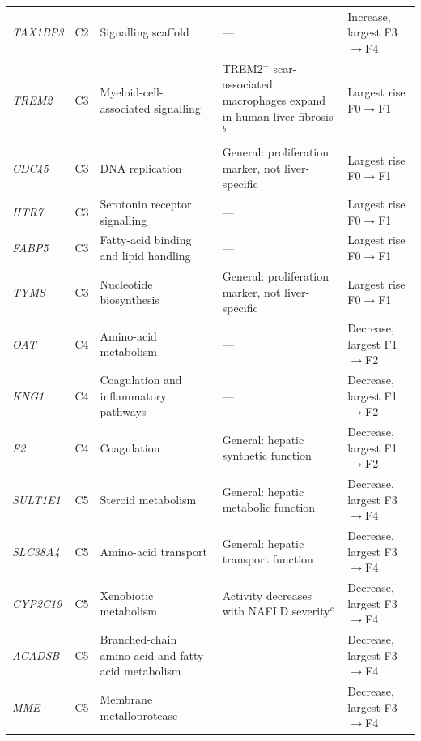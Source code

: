 \documentclass[10pt,a4paper]{article}
\begin{document}
\begin{table}[p]
{\begin{tabularx}{\linewidth}{@{}l c >{\raggedright\arraybackslash}X >{\raggedright\arraybackslash}X >{\raggedright\arraybackslash}p{3.6cm}@{}}
\textit{TAX1BP3} & C2 & Signalling scaffold & --- & Increase, largest F3$\rightarrow$F4 \\
\textit{TREM2} & C3 & Myeloid-cell-associated signalling & TREM2$^{+}$ scar-associated macrophages expand in human liver fibrosis$^{b}$ & Largest rise F0$\rightarrow$F1 \\
\textit{CDC45} & C3 & DNA replication & General: proliferation marker, not liver-specific & Largest rise F0$\rightarrow$F1 \\
\textit{HTR7} & C3 & Serotonin receptor signalling & --- & Largest rise F0$\rightarrow$F1 \\
\textit{FABP5} & C3 & Fatty-acid binding and lipid handling & --- & Largest rise F0$\rightarrow$F1 \\
\textit{TYMS} & C3 & Nucleotide biosynthesis & General: proliferation marker, not liver-specific & Largest rise F0$\rightarrow$F1 \\
\textit{OAT} & C4 & Amino-acid metabolism & --- & Decrease, largest F1$\rightarrow$F2 \\
\textit{KNG1} & C4 & Coagulation and inflammatory pathways & --- & Decrease, largest F1$\rightarrow$F2 \\
\textit{F2} & C4 & Coagulation & General: hepatic synthetic function & Decrease, largest F1$\rightarrow$F2 \\
\textit{SULT1E1} & C5 & Steroid metabolism & General: hepatic metabolic function & Decrease, largest F3$\rightarrow$F4 \\
\textit{SLC38A4} & C5 & Amino-acid transport & General: hepatic transport function & Decrease, largest F3$\rightarrow$F4 \\
\textit{CYP2C19} & C5 & Xenobiotic metabolism & Activity decreases with NAFLD severity$^{c}$ & Decrease, largest F3$\rightarrow$F4 \\
\textit{ACADSB} & C5 & Branched-chain amino-acid and fatty-acid metabolism & --- & Decrease, largest F3$\rightarrow$F4 \\
\textit{MME} & C5 & Membrane metalloprotease & --- & Decrease, largest F3$\rightarrow$F4 \\
\bottomrule
\end{tabularx}}
\par{}
\end{table}
\end{document}
